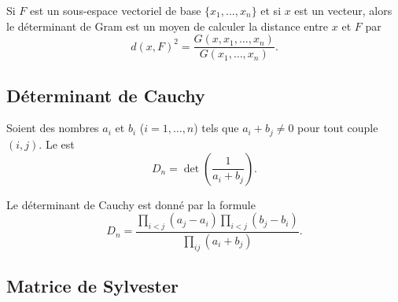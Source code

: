 \begin{proposition}\label{PropMsZhIK}
	Si \( F\) est un sous-espace vectoriel de base \( \{ x_1,\ldots, x_n \}\) et si \( x\) est un vecteur, alors le déterminant de Gram est un moyen de calculer la distance entre \( x\) et \( F\) par
	\begin{equation}
		d(x,F)^2=\frac{ G(x,x_1,\ldots, x_n)}{ G(x_1,\ldots, x_n) }.
	\end{equation}
\end{proposition}

\subsection{Déterminant de Cauchy}

Soient des nombres \( a_i\) et \( b_i\) (\( i=1,\ldots, n\)) tels que \( a_i+b_j\neq 0\) pour tout couple \( (i,j)\). Le  est
\begin{equation}
	D_n=\det\left( \frac{1}{ a_i+b_j } \right).
\end{equation}

\begin{proposition} \label{ProptoDYKA}
	Le déterminant de Cauchy est donné par la formule
	\begin{equation}
		D_n=\frac{ \prod_{i<j}(a_j-a_i)\prod_{i<j}(b_j-b_i) }{ \prod_{ij}(a_i+b_j) }.
	\end{equation}
\end{proposition}

\subsection{Matrice de Sylvester}
\label{subsecSQBJfr}

